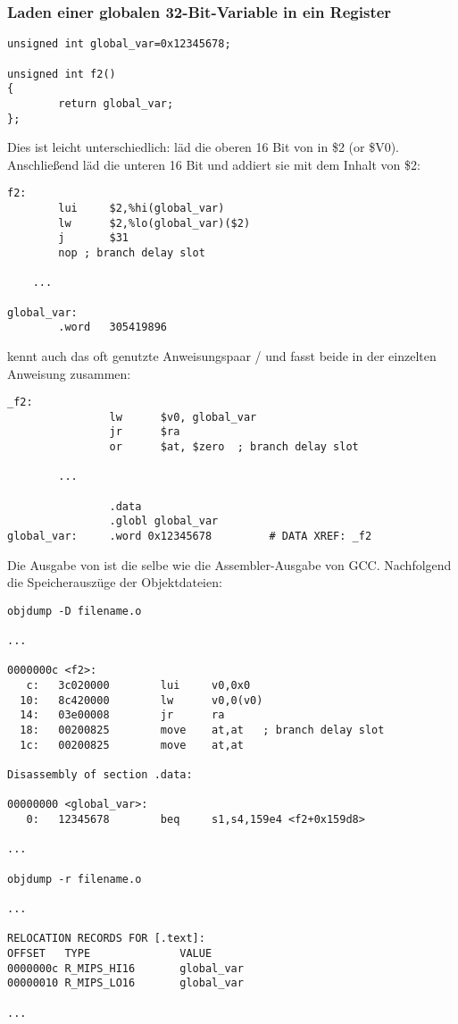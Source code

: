 \subsubsection{Laden einer globalen 32-Bit-Variable in ein Register}

\begin{lstlisting}[style=customc]
unsigned int global_var=0x12345678;

unsigned int f2()
{
        return global_var;
};
\end{lstlisting}


Dies ist leicht unterschiedlich:  läd die oberen 16 Bit von 
in \$2 (or \$V0). Anschließend läd  die unteren 16 Bit und addiert sie mit
dem Inhalt von \$2:

\begin{lstlisting}[caption=GCC 4.4.5 -O3 (\assemblyOutput),style=customasmMIPS]
f2:
        lui     $2,%hi(global_var)
        lw      $2,%lo(global_var)($2)
        j       $31
        nop	; branch delay slot

	...

global_var:
        .word   305419896
\end{lstlisting}

\IDA kennt auch das oft genutzte Anweisungspaar / und fasst beide
in der einzelten Anweisung  zusammen:

\begin{lstlisting}[caption=GCC 4.4.5 -O3 (IDA),style=customasmMIPS]
_f2:
                lw      $v0, global_var
                jr      $ra
                or      $at, $zero	; branch delay slot

		...

                .data
                .globl global_var
global_var:     .word 0x12345678         # DATA XREF: _f2
\end{lstlisting}

Die Ausgabe von  ist die selbe wie die Assembler-Ausgabe von GCC.
Nachfolgend die Speicherauszüge der Objektdateien:

\begin{lstlisting}[caption=objdump,style=customasmMIPS]
objdump -D filename.o

...

0000000c <f2>:
   c:   3c020000        lui     v0,0x0
  10:   8c420000        lw      v0,0(v0)
  14:   03e00008        jr      ra
  18:   00200825        move    at,at	; branch delay slot
  1c:   00200825        move    at,at

Disassembly of section .data:

00000000 <global_var>:
   0:   12345678        beq     s1,s4,159e4 <f2+0x159d8>

...

objdump -r filename.o

...

RELOCATION RECORDS FOR [.text]:
OFFSET   TYPE              VALUE
0000000c R_MIPS_HI16       global_var
00000010 R_MIPS_LO16       global_var

...

\end{lstlisting}

